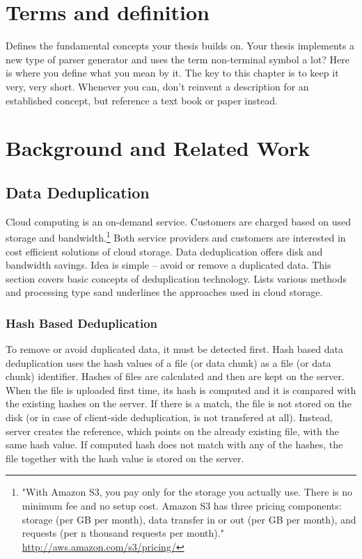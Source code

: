 \documentclass[12pt]{article}
\begin{document}
\pagebreak
\section{Terms and definition}
\label{sec:2}
Defines the fundamental concepts your thesis builds on. Your thesis implements a new type of parser generator and uses the term non-terminal symbol a lot? 
Here is where you define what you mean by it. The key to this chapter is to keep it very, very short. 
Whenever you can, don’t reinvent a description for an established concept, but reference a text book or paper instead.
\pagebreak
\section{Background and Related Work}
\label{sec:3}
\subsection{Data Deduplication}
\label{sub:Deduplication}
Cloud computing is an on-demand service. Customers are charged based on used storage and bandwidth.\footnote{"With Amazon S3, you pay only for the storage you actually use. There is no minimum fee and no setup cost. Amazon S3 has three pricing components: storage (per GB per month), data transfer in or out (per GB per month), and requests (per n thousand requests per month)." \url{http://aws.amazon.com/s3/pricing/}} Both service providers and customers are interested in cost efficient solutions of cloud storage. Data deduplication offers disk and bandwidth savings. Idea is simple -- avoid or remove a duplicated data. 
This section covers basic concepts of deduplication technology. Lists various methods and processing type sand underlines the approaches used in cloud storage.

\subsubsection{Hash Based Deduplication}
\label{subsub:HashBased}
To remove or avoid duplicated data, it must be detected first. Hash based data deduplication uses the hash values of a file (or data chunk) as a file (or data chunk) identifier. Hashes of files are calculated and then are kept on the server. When the file is uploaded first time, its hash is computed and it is compared with the existing hashes on the server. If there is a match, the file is not stored on the disk (or in case of client-side deduplication, is not transfered at all). Instead, server creates the reference, which points on the already existing file, with the same hash value. If computed hash does not match with any of the hashes, the file together with the hash value is stored on the server.\cite{DeDupOverView}
\end{document}
